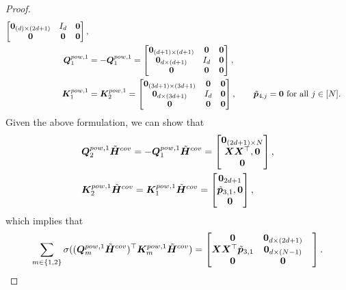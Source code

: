 \begin{proof}
\begin{align*}
\begin{bmatrix}
            \boldsymbol{0}_{(d)\times(2d+1)}&I_d&\boldsymbol{0}\\
            \boldsymbol{0}&\boldsymbol{0}&\boldsymbol{0}
        \end{bmatrix},\\
        \boldsymbol{Q}_1^{pow,1}&=-\boldsymbol{Q}_1^{pow,1}=\begin{bmatrix}
           \boldsymbol{0}_{(d+1)\times (d+1)}& \boldsymbol{0}&\boldsymbol{0}\\
            \boldsymbol{0}_{d\times (d+1)}&I_d&\boldsymbol{0}\\
            \boldsymbol{0}&\boldsymbol{0}&\boldsymbol{0}
        \end{bmatrix},\\
        \boldsymbol{K}_1^{pow,1}&=\boldsymbol{K}_2^{pow,1}=\begin{bmatrix}
            \boldsymbol{0}_{(3d+1)\times(3d+1)}&\boldsymbol{0}&\boldsymbol{0}\\
            \boldsymbol{0}_{d\times(3d+1)}&I_d&\boldsymbol{0}\\
            \boldsymbol{0}&\boldsymbol{0}&\boldsymbol{0}
        \end{bmatrix},\qquad\tilde{\boldsymbol{p}}_{4,j} = \boldsymbol{0}\text{ for all }j\in[N].
    \end{align*}
    Given the above formulation, we can show that 
    \begin{align*}
       &\boldsymbol{Q}_2^{pow,1}\tilde{\boldsymbol{H}}^{cov}=-\boldsymbol{Q}_1^{pow,1}\tilde{\boldsymbol{H}}^{cov} = \begin{bmatrix}
        \boldsymbol{0}_{(2d+1)\times N}\\
            \boldsymbol{X}\boldsymbol{X}^\top,\boldsymbol{0}\\
            \boldsymbol{0}
        \end{bmatrix},\\
        &\boldsymbol{K}_2^{pow,1}\tilde{\boldsymbol{H}}^{cov}=\boldsymbol{K}_1^{pow,1}\tilde{\boldsymbol{H}}^{cov}=\begin{bmatrix}
            \boldsymbol{0}_{2d+1}\\
            \tilde{\boldsymbol{p}}_{3,1},\boldsymbol{0}\\
            \boldsymbol{0}
        \end{bmatrix},
    \end{align*}
    which implies that 
    \begin{align*}
    \sum_{m\in\{1,2\}}\sigma((\boldsymbol{Q}_m^{pow, 1}\tilde{\boldsymbol{H}}^{cov})^\top\boldsymbol{K}_m^{pow,1}\tilde{\boldsymbol{H}}^{cov})=\begin{bmatrix}
           \boldsymbol{0}& \boldsymbol{0}_{d\times(2d+1)}&\\
            \boldsymbol{X}\boldsymbol{X}^\top\tilde{\boldsymbol{p}}_{3,1}&\boldsymbol{0}_{d\times(N-1)}\\
            \boldsymbol{0}&\boldsymbol{0}&
        \end{bmatrix}.
    \end{align*}

\end{proof}
